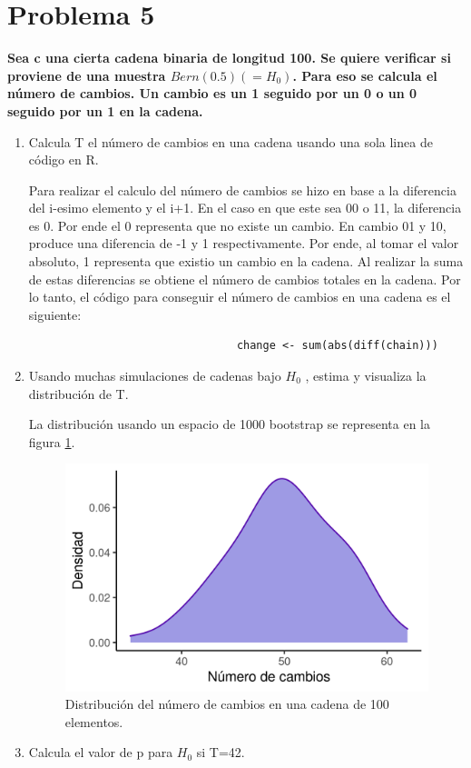 \section*{Problema 5}

\textbf{Sea c una cierta cadena binaria de longitud 100. Se quiere verificar si proviene de una muestra $Bern(0.5)(=H_0)$. Para eso se calcula el número de cambios. Un cambio es un 1 seguido por un 0 o un 0 seguido por un 1 en la cadena.}

\begin{enumerate}
	\item  Calcula T el número de cambios en una cadena usando una sola linea de código en R.

	      Para realizar el calculo del número de cambios se hizo en base a la diferencia del i-esimo elemento y el i+1. En el caso en que este sea 00 o 11, la diferencia es 0. Por ende el 0 representa que no existe un cambio. En cambio 01 y 10, produce una diferencia de -1 y 1 respectivamente. Por ende, al tomar el valor absoluto, 1 representa que existio un cambio en la cadena. Al realizar la suma de estas diferencias se obtiene el número de cambios totales en la cadena. Por lo tanto, el código para conseguir el número de cambios en una cadena es el siguiente:

	      \begin{verbatim}
								change <- sum(abs(diff(chain)))
			\end{verbatim}

	\item Usando muchas simulaciones de cadenas bajo $H_0$ , estima y visualiza la distribución de T.

	      La distribución usando un espacio de 1000 bootstrap se representa en la figura \ref{fig:problema5_distribution}.

	      \begin{figure}[H]
		      \centering
		      \includegraphics[width=14cm]{Graphics/problema05.png}
		      \caption{Distribución del número de cambios en una cadena de 100 elementos.}
		      \label{fig:problema5_distribution}
	      \end{figure}
	\item Calcula el valor de p para $H_0$ si T=42.
\end{enumerate}
